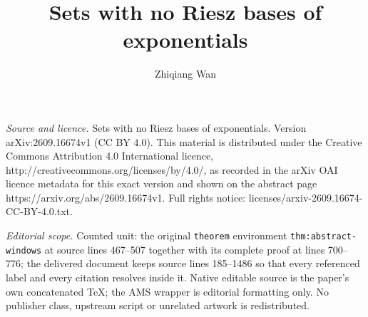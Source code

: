 \documentclass[10pt,a4paper]{amsart}
\newcommand\1{\mathbbm{1}}
\begin{document}
\title[Sets with no Riesz bases of exponentials]{Sets with no Riesz bases of exponentials}
\author{Zhiqiang Wan}
\date{}
\maketitle
\noindent\emph{Source and licence.} Sets with no Riesz bases of exponentials. Version arXiv:2609.16674v1 (CC BY 4.0). This material is distributed under the Creative Commons Attribution 4.0 International licence, http://creativecommons.org/licenses/by/4.0/, as recorded in the arXiv OAI licence metadata for this exact version and shown on the abstract page https://arxiv.org/abs/2609.16674v1. Full rights notice: licenses/arxiv-2609.16674-CC-BY-4.0.txt.\par\smallskip
\noindent\textit{Editorial scope.} Counted unit: the original \texttt{theorem} environment \texttt{thm:abstract-windows} at source lines 467--507 together with its complete proof at lines 700--776; the delivered document keeps source lines 185--1486 so that every referenced label and every citation resolves inside it. Native editable source is the paper's own concatenated TeX; the AMS wrapper is editorial formatting only. No publisher class, upstream script or unrelated artwork is redistributed.
\end{document}
